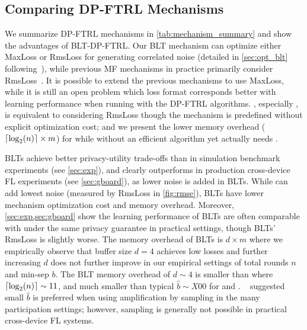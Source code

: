 \subsection{Comparing DP-FTRL Mechanisms}
We summarize DP-FTRL mechanisms in \cref{tab:mechanism_summary}  and show the advantages of BLT-DP-FTRL. Our BLT mechanism can optimize either MaxLoss or RmsLoss for generating correlated noise (detailed in \cref{sec:opt_blt} following~\citep{mcmahan2024efficient}), while previous MF mechanisms in practice primarily consider RmsLoss~\citep{choquette2023amplified,mckenna2024scaling}. It is possible to extend the previous mechanisms to use MaxLoss, while it is still an open problem which loss format corresponds better with learning performance when running with the DP-FTRL algorithms. \treeagg, especially \tafull, is equivalent to considering RmsLoss though the mechanism is predefined without explicit optimization cost; and we present the lower memory overhead ($\lceil\log_2(n)\rceil \times m$) for \treeagg while \tafull without an efficient algorithm yet actually needs . 

BLTs achieve better privacy-utility trade-offs than \tafull in simulation benchmark experiments (see \cref{sec:exp}), and clearly outperforms \treeagg in production cross-device FL experiments (see \cref{sec:gboard}), as lower noise is added in BLTs. While \bandmf\citep{choquette2023amplified} can add lowest noise (measured by RmsLoss in \cref{fig:rmse}), BLTs have lower mechanism optimization cost and memory overhead. Moreover, \cref{sec:exp,sec:gboard} show the learning performance of BLTs are often comparable with \bandmf under the same privacy guarantee in practical settings, though BLTs' RmsLoss is slightly worse. The memory overhead of BLTs is $d\times m$ where we empirically observe that buffer size $d=4$ achieves low losses and further increasing $d$ does not further improve in our empirical settings of total rounds $n$ and min-sep $b$. The BLT memory overhead of $d \sim 4$ is smaller than \treeagg where $\lceil\log_2(n)\rceil \sim 11$, and much smaller than typical $\hat b \sim X00$ for \bandmf and \bandtoep. \bandtoep~\citep{mckenna2024scaling} suggested small $\hat b$ is preferred when using amplification by sampling in the many participation settings; however, sampling is generally not possible in practical cross-device FL systems. 

